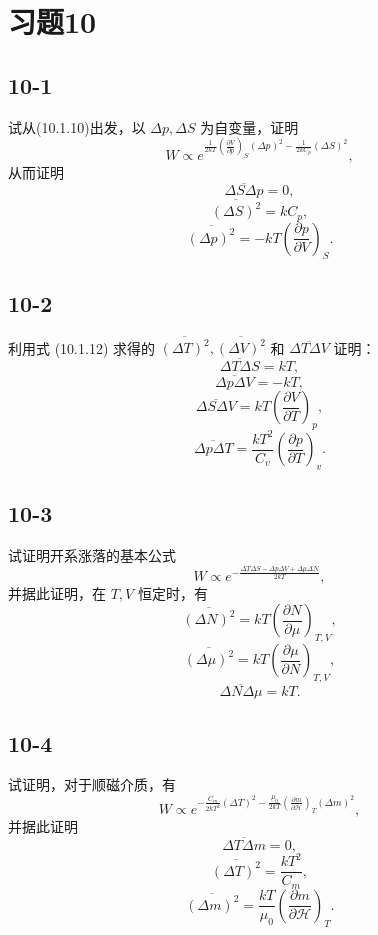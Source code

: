 \section{习题10}

\newpage
\subsection{10-1}
试从(10.1.10)出发，以 $\Delta p, \Delta S$ 为自变量，证明
$$ W \propto e^{\frac{1}{2kT} \left( \frac{\partial V}{\partial p} \right)_S (\Delta p)^2 - \frac{1}{2kC_p} (\Delta S)^2}, $$
从而证明
$$ \overline{\Delta S \Delta p} = 0, $$
$$ \overline{(\Delta S)^2} = kC_p, $$
$$ \overline{(\Delta p)^2} = -kT \left( \frac{\partial p}{\partial V} \right)_S. $$

\newpage
\subsection{10-2}
利用式 (10.1.12) 求得的 $\overline{(\Delta T)^2}, \overline{(\Delta V)^2}$ 和 $\overline{\Delta T \Delta V}$ 证明：
$$ \overline{\Delta T \Delta S} = kT, $$
$$ \overline{\Delta p \Delta V} = -kT, $$
$$ \overline{\Delta S \Delta V} = kT \left( \frac{\partial V}{\partial T} \right)_p, $$
$$ \overline{\Delta p \Delta T} = \frac{kT^2}{C_v} \left( \frac{\partial p}{\partial T} \right)_v. $$

\newpage
\subsection{10-3}
试证明开系涨落的基本公式
$$ W \propto e^{-\frac{\Delta T \Delta S - \Delta p \Delta V + \Delta \mu \Delta N}{2kT}}, $$
并据此证明，在 $T, V$ 恒定时，有
$$ \overline{(\Delta N)^2} = kT \left( \frac{\partial N}{\partial \mu} \right)_{T,V}, $$
$$ \overline{(\Delta \mu)^2} = kT \left( \frac{\partial \mu}{\partial N} \right)_{T,V}, $$
$$ \overline{\Delta N \Delta \mu} = kT. $$

\newpage
\subsection{10-4}
试证明，对于顺磁介质，有
$$ W \propto e^{-\frac{C_m}{2kT^2} (\Delta T)^2 - \frac{\mu_0}{2kT} \left( \frac{\partial m}{\partial \mathcal{H}} \right)_T (\Delta m)^2}, $$
并据此证明
$$ \overline{\Delta T \Delta m} = 0, $$
$$ \overline{(\Delta T)^2} = \frac{kT^2}{C_m}, $$
$$ \overline{(\Delta m)^2} = \frac{kT}{\mu_0} \left( \frac{\partial m}{\partial \mathcal{H}} \right)_T. $$

